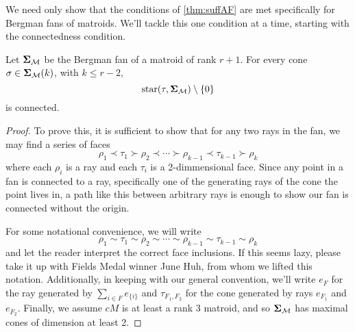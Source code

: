 \documentclass[12pt,oneside]{../../sfsuthesis}
\begin{document}
We need only show that the conditions of \th\ref{thm:suffAF} are met specifically for Bergman fans of matroids.
We'll tackle this one condition at a time, starting with the connectedness condition.

\begin{lemma}[Connectedness]\th\label{thm:matroidConnected}
    Let \( \bm{\Sigma}_{\mathcal{M}} \) be the Bergman fan of a matroid of rank \( r + 1 \).
    For every cone \( \sigma \in \bm{\Sigma}_{\mathcal{M}}(k) \), with \( k \leq r - 2 \),
    \[
        \operatorname{star}(\tau, \bm{\Sigma}_{\mathcal{M}}) \setminus \{ 0 \}
    \]
    is connected.
\end{lemma}
\begin{proof}
    To prove this, it is sufficient to show that for any two rays in the fan, we may find a series of faces
    \[
        \rho_1 \prec \tau_1 \succ \rho_2 \prec \cdots \succ \rho_{k-1} \prec \tau_{k-1} \succ \rho_k
    \]
    where each \( \rho_i \) is a ray and each \( \tau_i \) is a 2-dimmensional face.
    Since any point in a fan is connected to a ray, specifically one of the generating rays of the cone the point lives in, a path like this between arbitrary rays is enough to show our fan is connected without the origin.

    For some notational convenience, we will write
    \[
        \rho_1 \sim \tau_1 \sim \rho_2 \sim \cdots \sim \rho_{k-1} \sim \tau_{k-1} \sim \rho_k
    \]
    and let the reader interpret the correct face inclusions.
    If this seems lazy, please take it up with Fields Medal winner June Huh, from whom we lifted this notation.
    Additionally, in keeping with our general convention, we'll write \( e_F \) for the ray generated by \( \sum_{i \in F} e_{\{i\}} \) and \( \tau_{F_1, F_2} \) for the cone generated by rays \( e_{F_1} \) and \( e_{F_2} \).
    Finally, we assume \( cM \) is at least a rank 3 matroid, and so \( \bm{\Sigma}_{\mathcal{M}} \) has maximal cones of dimension at least 2.


\end{proof}
\end{document}
